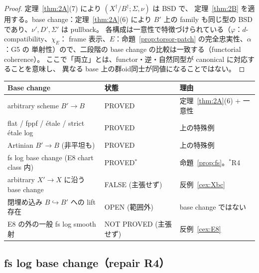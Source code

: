 \documentclass[11pt,a4paper]{article}
\numberwithin{equation}{section}
\theoremstyle{definition}
\begin{document}
\begin{proof}
定理~\ref{thm:2A}(7) により $(X^\dagger/B^\dagger;\Sigma,\nu)$ は BSD で、
定理~\ref{thm:2B} を適用する。base change：定理~\ref{thm:2A}(6) により
$B'$ 上の family も同じ型の BSD であり、$\nu',D',\Sigma'$ は pullback。
各構成は一意性で特徴づけられている（$\varphi$：$d$-compatibility、$\chi_E$：
frame 表示、$E$：命題~\ref{prop:torsor-patch} の完全忠実性、$\alpha$：G5 の
単射性）ので、二段階の base change の比較は一致する（functorial coherence）。
ここで「両立」とは、functor・逆・自然同型が canonical に対応することを意味し、
異なる base 上の群oid同士が同値になることではない。
\end{proof}

\begin{table}[h]
\centering
\begin{tabular}{@{}lll@{}}
\hline
Base change & 状態 & 理由 \\
\hline
arbitrary scheme $B'\to B$ & PROVED & 定理~\ref{thm:2A}(6) + 一意性 \\
flat / fppf / étale / strict étale log & PROVED & 上の特殊例 \\
Artinian $B'\to B$ (非平坦も) & PROVED & 上の特殊例 \\
fs log base change (E8 chart class 内) & PROVED$^\ast$ & 命題~\ref{prop:fs}。$^\ast$R4 \\
arbitrary $X'\to X$ に沿う base change & FALSE (主張せず) & 反例~\ref{cex:Xbc} \\
閉埋め込み $B\hookrightarrow B'$ への lift 存在 & OPEN (範囲外) & base change ではない \\
E8 の外の一般 fs log smooth 射 & NOT PROVED (主張せず) & 反例~\ref{cex:E8} \\
\hline
\end{tabular}
\end{table}

\subsection{fs log base change（repair R4）}
\end{document}
